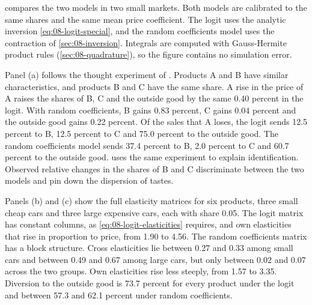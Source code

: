  compares the two models in two small markets. Both models are calibrated to the same
shares and the same mean price coefficient. The logit uses the analytic inversion
\eqref{eq:08-logit-special}, and the random coefficients model uses the contraction of \cref{sec:08-inversion}.
Integrals are computed with Gauss-Hermite product rules (\cref{sec:08-quadrature}), so the figure contains no
simulation error.

Panel (a) follows the thought experiment of \citet[p.~529]{Nevo2000a}. Products A and B have similar
characteristics, and products B and C have the same share. A rise in the price of A raises the shares of B, C
and the outside good by the same 0.40 percent in the logit. With random coefficients, B gains 0.83 percent, C
gains 0.04 percent and the outside good gains 0.22 percent. Of the sales that A loses, the logit sends 12.5
percent to B, 12.5 percent to C and 75.0 percent to the outside good. The random coefficients model sends
37.4 percent to B, 2.0 percent to C and 60.7 percent to the outside good. \citeauthor{Nevo2000a} uses the same
experiment to explain identification. Observed relative changes in the shares of B and C discriminate between
the two models and pin down the dispersion of tastes.

Panels (b) and (c) show the full elasticity matrices for six products, three small cheap cars and three large
expensive cars, each with share 0.05. The logit matrix has constant columns, as \eqref{eq:08-logit-elasticities}
requires, and own elasticities that rise in proportion to price, from 1.90 to 4.56. The random coefficients
matrix has a block structure. Cross elasticities lie between 0.27 and 0.33 among small cars and between 0.49 and
0.67 among large cars, but only between 0.02 and 0.07 across the two groups. Own elasticities rise less steeply,
from 1.57 to 3.35. Diversion to the outside good is 73.7 percent for every product under the logit and between
57.3 and 62.1 percent under random coefficients.

